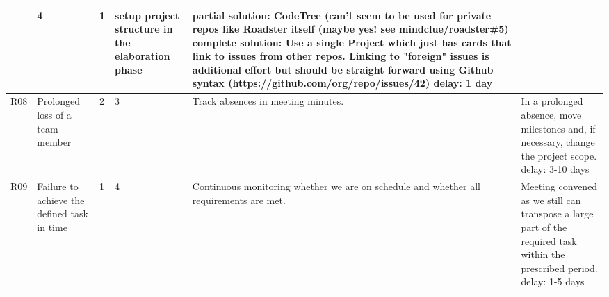 \begin{center}
\begin{longtable}{|p{6mm}|p{30mm}|p{6mm}|p{8mm}|p{30mm}|p{64mm}|}
		& \cellcolor{yellow!50}4
		& \cellcolor{yellow!50}1
		& setup project structure in the elaboration phase
		& partial solution: \newline CodeTree (can't seem to be used for private repos like Roadster itself (maybe yes! see  mindclue/roadster\#5) \newline
		\newline complete solution: \newline Use a single Project which just has cards that link to issues from other repos. 
		Linking to "foreign" issues is additional effort but should be straight forward using Github syntax (https://github.com/org/repo/issues/42)
		\newline delay: 1 day \\ \hline
	R08 
		& Prolonged loss of a team member
		& \cellcolor{yellow!50}2
		& \cellcolor{yellow!50}3
		& Track absences in meeting minutes.
		& In a prolonged absence, move milestones and, if necessary, change the project scope. \newline delay: 3-10 days \\ \hline
		
	R09 
		& Failure to achieve the defined task in time
		& \cellcolor{yellow!50}1
		& \cellcolor{yellow!50}4
		& Continuous monitoring whether we are on schedule and whether all requirements are met. 
		& Meeting convened as we still can transpose a large part of the required task within the prescribed period. \newline delay: 1-5 days\\ \hline		
   \end{longtable}
\end{center}

